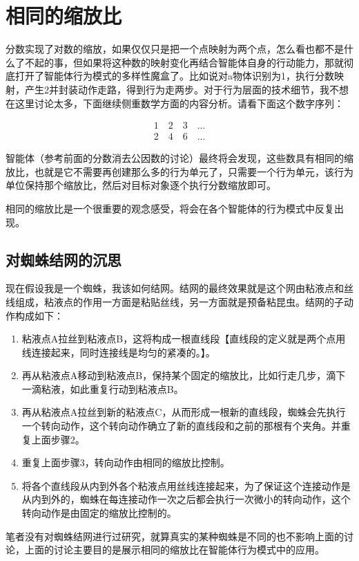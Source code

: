 \documentclass[12pt,oneside]{book}
\begin{document}
\section{相同的缩放比}
分数实现了对数的缩放，如果仅仅只是把一个点映射为两个点，怎么看也都不是什么了不起的事，但如果将这种数的映射变化再结合智能体自身的行动能力，那就彻底打开了智能体行为模式的多样性魔盒了。比如说对a物体识别为1，执行分数映射，产生2并封装动作走路，得到行为走两步。对于行为层面的技术细节，我不想在这里讨论太多，下面继续侧重数学方面的内容分析。请看下面这个数字序列：

\begin{align*}
1 \quad 2  \quad 3 \quad ... \\
2 \quad 4  \quad 6 \quad ...
\end{align*}


智能体（参考前面的分数消去公因数的讨论）最终将会发现，这些数具有相同的缩放比，也就是它不需要再创建那么多的行为单元了，只需要一个行为单元，该行为单位保持那个缩放比，然后对目标对象逐个执行分数缩放即可。

相同的缩放比是一个很重要的观念感受，将会在各个智能体的行为模式中反复出现。


\subsection{对蜘蛛结网的沉思}
现在假设我是一个蜘蛛，我该如何结网。结网的最终效果就是这个网由粘液点和丝线组成，粘液点的作用一方面是粘贴丝线，另一方面就是预备粘昆虫。结网的子动作构成如下：

\begin{enumerate}
\item 粘液点A拉丝到粘液点B，这将构成一根直线段【直线段的定义就是两个点用线连接起来，同时连接线是均匀的紧凑的。】。
\item 再从粘液点A移动到粘液点B，保持某个固定的缩放比，比如行走几步，滴下一滴粘液，如此重复行动到粘液点B。
\item 再从粘液点A拉丝到新的粘液点C，从而形成一根新的直线段，蜘蛛会先执行一个转向动作，这个转向动作确立了新的直线段和之前的那根有个夹角。并重复上面步骤2。
\item 重复上面步骤3，转向动作由相同的缩放比控制。
\item 将各个直线段从内到外各个粘液点用丝线连接起来，为了保证这个连接动作是从内到外的，蜘蛛在每连接动作一次之后都会执行一次微小的转向动作，这个转向动作是由固定的缩放比控制的。
\end{enumerate}

笔者没有对蜘蛛结网进行过研究，就算真实的某种蜘蛛是不同的也不影响上面的讨论，上面的讨论主要目的是展示相同的缩放比在智能体行为模式中的应用。
\end{document}
